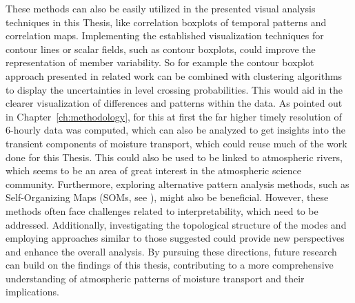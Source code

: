 These methods can also be easily utilized in the presented visual analysis techniques in this Thesis, like correlation boxplots of temporal patterns and correlation maps.
Implementing the established visualization techniques for contour lines or scalar fields, such as contour boxplots, could improve the representation of member variability.
So for example the contour boxplot approach presented in related work can be combined with clustering algorithms to display the uncertainties in level crossing probabilities. 
This would aid in the clearer visualization of differences and patterns within the data.
As pointed out in Chapter~\ref{ch:methodology}, for this at first the far higher timely resolution of 6-hourly data was computed, which can also be analyzed to get insights into the transient components of moisture transport, which could reuse much of the work done for this Thesis. 
This could also be used to be linked to atmospheric rivers, which seems to be an area of great interest in the atmospheric science community.
Furthermore, exploring alternative pattern analysis methods, such as Self-Organizing Maps (SOMs, see ), might also be beneficial. 
However, these methods often face challenges related to interpretability, which need to be addressed.
Additionally, investigating the topological structure of the modes and employing approaches similar to those suggested  could provide new perspectives and enhance the overall analysis.
By pursuing these directions, future research can build on the findings of this thesis, contributing to a more comprehensive understanding of atmospheric patterns of moisture transport and their implications.
